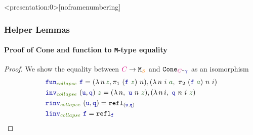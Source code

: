 \documentclass[xelatex,mathserif,serif,notheorems]{beamer} %
\theoremstyle{plain} %
\theoremstyle{definition}
\theoremstyle{remark}
\newcommand*{\term}[1]{\textcolor{green!30!black}{#1}} %
\newcommand*{\pathterm}[1]{\textcolor{green!65!red!75!black}{#1}}
\newcommand*{\type}[1]{\textcolor{magenta!90!black}{#1}}
\newcommand*{\container}[1]{\textcolor{orange}{#1}}
\newcommand*{\coalg}[2]{#1\texttt{-}#2}
\newcommand*{\function}[1]{\textcolor{blue!60!black}{\ensuremath{\mathtt{#1}}}}
\newcommand*{\typeformer}[1]{\ensuremath{\mathtt{#1}}}
\newcommand{\setlengths}{
  \setlength{\abovedisplayskip}{4pt}
  \setlength{\belowdisplayskip}{4pt}
  \setlength{\abovedisplayshortskip}{2pt}
  \setlength{\belowdisplayshortskip}{2pt}
}
\begin{document}
\begin{frame}<presentation:0>[noframenumbering] %
  \frametitle{Helper Lemmas}
  \framesubtitle{Proof of Cone and function to \texttt{M}-type equality}
  \begin{proof}\setlengths
    We show the equality between \(\type{C} \rightarrow \typeformer{M}_{\container{S}}\) and \(\typeformer{Cone}_{\coalg{\type{C}}{\function{\gamma}}}\) as an isomorphism
    \begin{align}
      &\function{fun}_{\pathterm{collapse}}~\function{f} = (\lambda\,n\,\term{z},\pi_1~(\function{f}~\term{z})~n),(\lambda\,n~i~\term{a},~\pi_2~(\function{f}~\term{a})~n~i) \\
      &\function{inv}_{\pathterm{collapse}}~(\function{u},\function{q})~\term{z} = (\lambda\,n,~\function{u}~n~\term{z}),(\lambda\,n\,i,~\function{q}~n~i~\term{z}) \\
      &\function{rinv}_{\pathterm{collapse}}~(\function{u},\function{q}) = \mathtt{refl}_{(\function{u},\function{q})} \\
      &\function{linv}_{\pathterm{collapse}}~\function{f} = \mathtt{refl}_{\function{f}}
    \end{align}
  \end{proof}
\end{frame}
\end{document}
